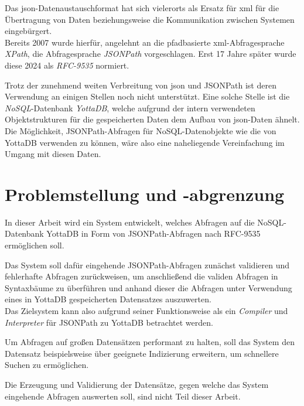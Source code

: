 \documentclass[oneside]{ausarbeitung}
\begin{document}
Das \ac{json}-Datenaustauschformat hat sich vielerorts als Ersatz für \ac{xml} für die Übertragung von Daten beziehungsweise die Kommunikation zwischen Systemen eingebürgert. \\
Bereits 2007 wurde hierfür, angelehnt an die pfadbasierte \ac{xml}-Abfragesprache \textit{XPath}, die Abfragesprache \textit{JSONPath} vorgeschlagen. Erst 17 Jahre später wurde diese 2024 als \textit{RFC-9535} normiert. \cite{Gössner:jsonpath}
	
Trotz der zunehmend weiten Verbreitung von \ac{json} und JSONPath ist deren Verwendung an einigen Stellen noch nicht unterstützt. Eine solche Stelle ist die \textit{NoSQL}-Datenbank \textit{YottaDB}, welche aufgrund der intern verwendeten Objektstrukturen für die gespeicherten Daten dem Aufbau von \ac{json}-Daten ähnelt. \\
Die Möglichkeit, JSONPath-Abfragen für NoSQL-Datenobjekte wie die von YottaDB verwenden zu können, wäre also eine naheliegende Vereinfachung im Umgang mit diesen Daten.
	





\pagebreak

\section{Problemstellung und -abgrenzung}
\label{sec:problemstellung}

In dieser Arbeit wird ein System entwickelt, welches Abfragen auf die NoSQL-Datenbank YottaDB in Form von JSONPath-Abfragen nach RFC-9535 ermöglichen soll. 
	
Das System soll dafür eingehende JSONPath-Abfragen zunächst validieren und fehlerhafte Abfragen zurückweisen, um anschließend die validen Abfragen in Syntaxbäume zu überführen und anhand dieser die Abfragen unter Verwendung eines in YottaDB gespeicherten Datensatzes auszuwerten. \\
Das Zielsystem kann also aufgrund seiner Funktionsweise als ein \textit{Compiler} und \textit{Interpreter} für JSONPath zu YottaDB betrachtet werden.
	
Um Abfragen auf großen Datensätzen performant zu halten, soll das System den Datensatz beispielsweise über geeignete Indizierung erweitern, um schnellere Suchen zu ermöglichen.
	
Die Erzeugung und Validierung der Datensätze, gegen welche das System eingehende Abfragen auswerten soll, sind nicht Teil dieser Arbeit. 
	
\end{document}

